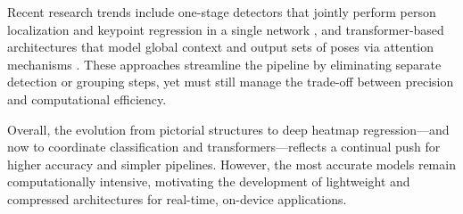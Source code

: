 Recent research trends include one-stage detectors that jointly perform person localization and keypoint regression in a single network \citep{Nie2019}, and transformer-based architectures that model global context and output sets of poses via attention mechanisms \citep{Stoffl2021}. These approaches streamline the pipeline by eliminating separate detection or grouping steps, yet must still manage the trade-off between precision and computational efficiency.

Overall, the evolution from pictorial structures to deep heatmap regression—and now to coordinate classification and transformers—reflects a continual push for higher accuracy and simpler pipelines. However, the most accurate models remain computationally intensive, motivating the development of lightweight and compressed architectures for real-time, on-device applications.